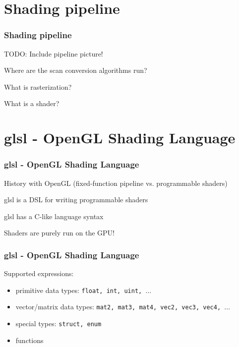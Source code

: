 \documentclass{beamer}
\begin{document}
%
%
%
\section{Shading pipeline}

\begin{frame}
\frametitle{Shading pipeline}

TODO: Include pipeline picture!

Where are the scan conversion algorithms run?

What is rasterization?

What is a shader?
\end{frame}


%
%
%
\section{glsl - OpenGL Shading Language}

\begin{frame}
\frametitle{glsl - OpenGL Shading Language}

History with OpenGL (fixed-function pipeline vs. programmable shaders)

glsl is a DSL for writing programmable shaders

glsl has a C-like language syntax

Shaders are purely run on the GPU!
\end{frame}


%
%
%
\begin{frame}
\frametitle{glsl - OpenGL Shading Language}
Supported expressions:

\begin{itemize}
\item primitive data types: \texttt{float, int, uint, $\ldots$}
\item vector/matrix data types: \texttt{mat2, mat3, mat4, vec2, vec3, vec4, $\ldots$}
\item special types: \texttt{struct, enum}
\item functions
\end{itemize}

\end{frame}
\end{document}
